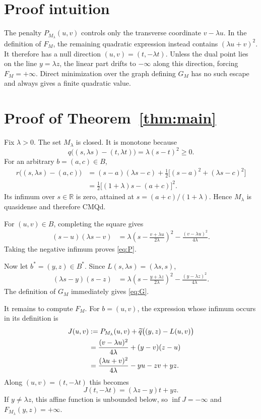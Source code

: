\documentclass[11pt]{article}
\newcommand{\R}{\mathbb R}
\newcommand{\qtilde}{\widetilde q}
\begin{document}
\section{Proof intuition}

The penalty $P_{M_\lambda}(u,v)$ controls only the transverse coordinate
$v-\lambda u$.  In the definition of $F_M$, the remaining quadratic
expression instead contains $(\lambda u+v)^2$.  It therefore has a null
direction $(u,v)=(t,-\lambda t)$.  Unless the dual point lies on the line
$y=\lambda z$, the linear part drifts to $-\infty$ along this direction,
forcing $F_M=+\infty$.  Direct minimization over the graph defining $G_M$
has no such escape and always gives a finite quadratic value.

\section{Proof of Theorem~\ref{thm:main}}

Fix $\lambda>0$.  The set $M_\lambda$ is closed.  It is monotone because
\[
 q\bigl((s,\lambda s)-(t,\lambda t)\bigr)
   =\lambda(s-t)^2\geq0.
\]
For an arbitrary $b=(a,c)\in B$,
\begin{align*}
 r\bigl((s,\lambda s)-(a,c)\bigr)
 &= (s-a)(\lambda s-c)
    +\frac12\bigl[(s-a)^2+(\lambda s-c)^2\bigr]\\
 &=\frac12\bigl[(1+\lambda)s-(a+c)\bigr]^2.
\end{align*}
Its infimum over $s\in\R$ is zero, attained at
$s=(a+c)/(1+\lambda)$.  Hence $M_\lambda$ is quasidense and therefore
CMQd.

For $(u,v)\in B$, completing the square gives
\begin{align*}
 (s-u)(\lambda s-v)
 &=
 \lambda\left(s-\frac{v+\lambda u}{2\lambda}\right)^2
 -\frac{(v-\lambda u)^2}{4\lambda}.
\end{align*}
Taking the negative infimum proves \eqref{eq:P}.

Now let $b^*=(y,z)\in B^*$.  Since
$L(s,\lambda s)=(\lambda s,s)$,
\begin{align*}
 (\lambda s-y)(s-z)
 &=
 \lambda\left(s-\frac{y+\lambda z}{2\lambda}\right)^2
 -\frac{(y-\lambda z)^2}{4\lambda}.
\end{align*}
The definition of $G_M$ immediately gives \eqref{eq:G}.

It remains to compute $F_M$.  For $b=(u,v)$, the expression whose
infimum occurs in its definition is
\begin{align}
 J(u,v)
 &:=
 P_{M_\lambda}(u,v)+\qtilde\bigl((y,z)-L(u,v)\bigr)\notag\\
 &=\frac{(v-\lambda u)^2}{4\lambda}
   +(y-v)(z-u)\notag\\
 &=\frac{(\lambda u+v)^2}{4\lambda}
   -yu-zv+yz.\label{eq:J}
\end{align}
Along $(u,v)=(t,-\lambda t)$ this becomes
\[
 J(t,-\lambda t)=(\lambda z-y)t+yz.
\]
If $y\neq\lambda z$, this affine function is unbounded below, so
$\inf J=-\infty$ and $F_{M_\lambda}(y,z)=+\infty$.
\end{document}
